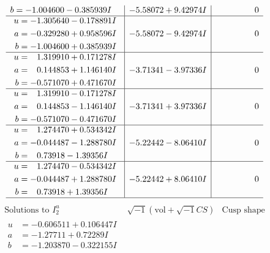 \documentclass[1p]{elsarticle_modified}
\theoremstyle{definition}
\newcommand{\I}{\sqrt{-1}}
\begin{document}
$$\begin{array}{c|c|c}
\begin{aligned}
b &= -1.004600 - 0.385939 I\end{aligned}
 & -5.58072 + 9.42974 I & \phantom{-0.000000 } 0 \\ \hline\begin{aligned}
u &= -1.305640 - 0.178891 I \\
a &= -0.329280 + 0.958596 I \\
b &= -1.004600 + 0.385939 I\end{aligned}
 & -5.58072 - 9.42974 I & \phantom{-0.000000 } 0 \\ \hline\begin{aligned}
u &= \phantom{-}1.319910 + 0.171278 I \\
a &= \phantom{-}0.144853 + 1.146140 I \\
b &= -0.571070 + 0.471670 I\end{aligned}
 & -3.71341 - 3.97336 I & \phantom{-0.000000 } 0 \\ \hline\begin{aligned}
u &= \phantom{-}1.319910 - 0.171278 I \\
a &= \phantom{-}0.144853 - 1.146140 I \\
b &= -0.571070 - 0.471670 I\end{aligned}
 & -3.71341 + 3.97336 I & \phantom{-0.000000 } 0 \\ \hline\begin{aligned}
u &= \phantom{-}1.274470 + 0.534342 I \\
a &= -0.044487 - 1.288780 I \\
b &= \phantom{-}0.73918 - 1.39356 I\end{aligned}
 & -5.22442 - 8.06410 I & \phantom{-0.000000 } 0 \\ \hline\begin{aligned}
u &= \phantom{-}1.274470 - 0.534342 I \\
a &= -0.044487 + 1.288780 I \\
b &= \phantom{-}0.73918 + 1.39356 I\end{aligned}
 & -5.22442 + 8.06410 I & \phantom{-0.000000 } 0\\
 \hline 
 \end{array}$$\newpage$$\begin{array}{c|c|c}  
\text{Solutions to }I^u_{2}& \I (\text{vol} + \sqrt{-1}CS) & \text{Cusp shape}\\
 \hline 
\begin{aligned}
u &= -0.606511 + 0.106447 I \\
a &= -1.27711 + 0.72289 I \\
b &= -1.203870 - 0.322155 I\end{aligned}

\end{array}$$
\end{document}
